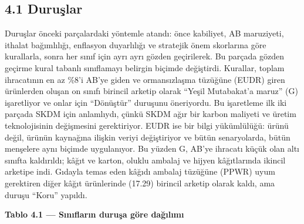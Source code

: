 \hypertarget{nace_kartlar_16-18-41-duruux15flar}{%
\subsection{4.1 Duruşlar}\label{nace_kartlar_16-18-41-duruux15flar}}

Duruşlar önceki parçalardaki yöntemle atandı: önce kabiliyet, AB maruziyeti, ithalat bağımlılığı, enflasyon duyarlılığı ve stratejik önem skorlarına göre kurallarla, sonra her sınıf için ayrı ayrı gözden geçirilerek. Bu parçada gözden geçirme kural tabanlı sınıflamayı belirgin biçimde değiştirdi. Kurallar, toplam ihracatının en az \%8'i AB'ye giden ve ormansızlaşma tüzüğüne (EUDR) giren ürünlerden oluşan on sınıfı birincil arketip olarak ``Yeşil Mutabakat'a maruz'' (G) işaretliyor ve onlar için ``Dönüştür'' duruşunu öneriyordu. Bu işaretleme ilk iki parçada SKDM için anlamlıydı, çünkü SKDM ağır bir karbon maliyeti ve üretim teknolojisinin değişmesini gerektiriyor. EUDR ise bir bilgi yükümlülüğü: ürünü değil, ürünün kaynağına ilişkin veriyi değiştiriyor ve bütün senaryolarda, bütün menşelere aynı biçimde uygulanıyor. Bu yüzden G, AB'ye ihracatı küçük olan altı sınıfta kaldırıldı; kâğıt ve karton, oluklu ambalaj ve hijyen kâğıtlarında ikincil arketipe indi. Gıdayla temas eden kâğıdı ambalaj tüzüğüne (PPWR) uyum gerektiren diğer kâğıt ürünlerinde (17.29) birincil arketip olarak kaldı, ama duruşu ``Koru'' yapıldı.


\textbf{Tablo 4.1 --- Sınıfların duruşa göre dağılımı}

\nopagebreak[4]

\begingroup\gbtablo\footnotesize

